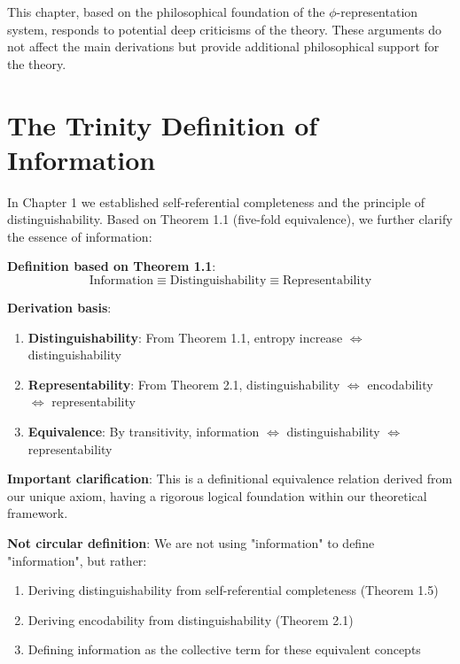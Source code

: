 
This chapter, based on the philosophical foundation of the $\phi$-representation system, responds to potential deep criticisms of the theory. These arguments do not affect the main derivations but provide additional philosophical support for the theory.

\section{The Trinity Definition of Information}
\label{sec:ch07_defense:the-trinity-definition-of-information}

In Chapter 1 we established self-referential completeness and the principle of distinguishability. Based on Theorem 1.1 (five-fold equivalence), we further clarify the essence of information:

\textbf{Definition based on Theorem 1.1}:
\begin{equation}
\boxed{\text{Information} \equiv \text{Distinguishability} \equiv \text{Representability}}
\end{equation}

\textbf{Derivation basis}:
\begin{enumerate}
\item \textbf{Distinguishability}: From Theorem 1.1, entropy increase $\Leftrightarrow$ distinguishability
\item \textbf{Representability}: From Theorem 2.1, distinguishability $\Leftrightarrow$ encodability $\Leftrightarrow$ representability
\item \textbf{Equivalence}: By transitivity, information $\Leftrightarrow$ distinguishability $\Leftrightarrow$ representability
\end{enumerate}

\textbf{Important clarification}: This is a definitional equivalence relation derived from our unique axiom, having a rigorous logical foundation within our theoretical framework.

\textbf{Not circular definition}: We are not using "information" to define "information", but rather:
\begin{enumerate}
\item Deriving distinguishability from self-referential completeness (Theorem 1.5)
\item Deriving encodability from distinguishability (Theorem 2.1)
\item Defining information as the collective term for these equivalent concepts
\end{enumerate}

